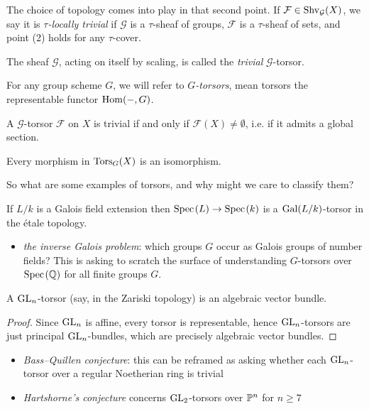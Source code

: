 \documentclass[11pt]{amsart}
\begin{document}
\begin{terminology} The choice of topology comes into play in that second point. If $\mathcal{F} \in \Shv_{\mathcal{G}}(X)$, we say it is $\tau$\textit{-locally trivial} if $\mathcal{G}$ is a $\tau$-sheaf of groups, $\mathcal{F}$ is a $\tau$-sheaf of sets, and point (2) holds for any $\tau$-cover.
\end{terminology}


\begin{example} The sheaf $\mathcal{G}$, acting on itself by scaling, is called the \textit{trivial} $\mathcal{G}$-torsor.
\end{example}

\begin{example} For any group scheme $G$, we will refer to $G$\textit{-torsors}, mean torsors the representable functor $\Hom(-,G)$.
\end{example}

\begin{proposition}\label{prop:torsor-trivial-iff-global-section} 
A $\mathcal{G}$-torsor $\mathcal{F}$ on $X$ is trivial if and only if $\mathcal{F}(X) \ne \emptyset$, i.e. if it admits a global section.
\end{proposition}



\begin{theorem} Every morphism in $\Tors_G(X)$ is an isomorphism.
\end{theorem}

So what are some examples of torsors, and why might we care to classify them?

\begin{example}\label{exa:galois-field-extn-torsor} 
If $L/k$ is a Galois field extension then $\Spec(L) \to \Spec(k)$ is a $\Gal(L/k)$-torsor in the \'etale topology.
\end{example}
\begin{itemize}
\item \textit{the inverse Galois problem}: which groups $G$ occur as Galois groups of number fields? This is asking to scratch the surface of understanding $G$-torsors over $\Spec(\Q)$ for all finite groups $G$.
\end{itemize}

\begin{example} A $\GL_n$-torsor (say, in the Zariski topology) is an algebraic vector bundle.
\end{example}
\begin{proof} Since $\GL_n$ is affine, every torsor is representable, hence $\GL_n$-torsors are just principal $\GL_n$-bundles, which are precisely algebraic vector bundles.
\end{proof}
\begin{itemize}
    \item \textit{Bass--Quillen conjecture}: this can be reframed as asking whether each $\GL_n$-torsor over a regular Noetherian ring is trivial
    \item \textit{Hartshorne's conjecture} concerns $\GL_2$-torsors over $\P^n$ for $n\ge7$
\end{itemize}
\end{document}
